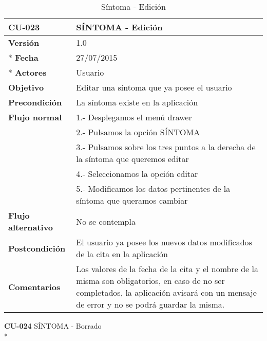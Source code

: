 \documentclass[../pfc.tex]{subfiles}
\begin{document}
	\begin{table}[H]
		\centering
		\begin{tabular}[t]{|p{3cm}|p{9.5cm}|}
			\hline \textbf{CU-023} & \textbf{SÍNTOMA - Edición} \\*
			\hline\hline \textbf{Versión} & 1.0 \\ *
			\hline\hline \textbf{Fecha} & 27/07/2015 \\ *
			\hline\textbf{Actores} 	& Usuario\\*
			\hline \textbf{Objetivo} & Editar una síntoma que ya posee el usuario\\* 			
			\hline \textbf{Precondición} & La síntoma existe en la aplicación\\* 
			\hline \textbf{Flujo normal} & 1.- Desplegamos el menú drawer \\* 
			& 2.- Pulsamos la opción SÍNTOMA\\*	
			& 3.- Pulsamos sobre los tres puntos a la derecha de la síntoma que queremos editar\\*	
			& 4.- Seleccionamos la opción editar\\*	
			& 5.- Modificamos los datos pertinentes de la síntoma que queramos cambiar\\*	
			\hline \textbf{Flujo alternativo} & No se contempla \\* 
			\hline \textbf{Postcondición} & El usuario ya posee los nuevos datos modificados de la cita en la aplicación \\* 
			\hline \textbf{Comentarios}   & Los valores de la fecha de la cita y el nombre de la misma son obligatorios, en caso de no ser completados, la aplicación avisará con un mensaje de error y no se podrá guardar la misma.\\*
			\hline
		\end{tabular}
		\caption{Síntoma - Edición}
		\label{tabla:caso023}
	\end{table}
	
	\textbf{CU-024}	SÍNTOMA - Borrado\\*
	
\end{document}
